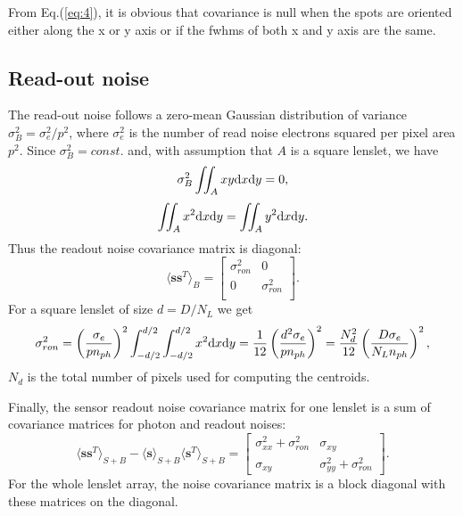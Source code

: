 From Eq.(\ref{eq:4}), it is obvious that covariance is null when the
spots are oriented either along the x or y axis or if the fwhms of both x and
y axis are the same.

\subsection{Read-out noise}
\label{sec:read-out-noise}

The read-out noise follows a zero-mean
Gaussian distribution of variance $\sigma^{2}_{B} = \sigma^2_e / p^{2}$,
where $\sigma^{2}_{e}$ is the number of read noise electrons squared per
pixel area $p^2$. Since $\sigma^{2}_{B} = const.$ and, with assumption that $A$
is a square lenslet, we have
$$
  \sigma^{2}_{B} \iint_{A} xy {\rm d}x{\rm d}y = 0,
$$
$$
  \iint_{A} x^{2} {\rm d}x{\rm d}y =
  \iint_{A} y^{2} {\rm d}x{\rm d}y.
$$
Thus the readout noise covariance matrix is diagonal:
\begin{equation} \label{eq:14}
	\langle \bm{s} \bm{s}^{T} \rangle_{B} =
	\left[{}
	\begin{array}{cc}
		\sigma^{2}_{ron} & 0 \\
		0 & \sigma^{2}_{ron} \\
	\end{array}
	\right].
\end{equation}
For a square lenslet of size $d=D/N_L$ we get
\begin{equation} \label{eq:15}
     \sigma_{ron}^2 = \left(\sigma_e \over p n_{ph} \right)^2
     \int_{-d/2}^{d/2} \int_{-d/2}^{d/2} x^2 {\rm d}x{\rm d}y \\
                   = {1\over 12}\left(d^2\sigma_e \over p n_{ph} \right)^2 =
                   {N_d^2\over 12}\left(D\sigma_e \over N_L n_{ph} \right)^2,
\end{equation}
$N_d$ is the total number of pixels used for computing the centroids.

Finally, the sensor readout
noise covariance matrix for one lenslet is a sum of covariance matrices for
photon and readout noises:
\begin{equation}
  \label{eq:16}
  \langle \bm{s} \bm{s}^{T} \rangle_{S+B} -
  \langle \bm{s} \rangle_{S+B} \langle \bm{s}^{T} \rangle_{S+B} =
  \left[
    \begin{array}{cc}
      \sigma^2_{xx} + \sigma_{ron}^2 & \sigma_{xy} \\
      \sigma_{xy} & \sigma^2_{yy} + \sigma_{ron}^2
    \end{array}
  \right].
\end{equation}
For the whole lenslet array, the noise covariance matrix is a block diagonal
with these matrices on the diagonal.